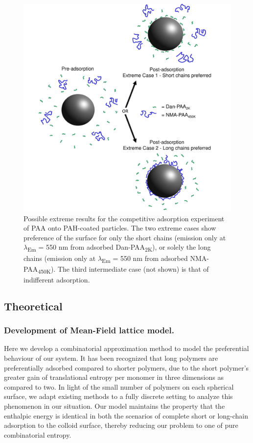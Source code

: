 \documentclass[twoside,twocolumn,9pt]{article}
\begin{document}
\begin{figure}[h]
\includegraphics[scale=0.12]{Figure2.pdf}
\caption{Possible extreme results for the competitive adsorption experiment of PAA onto PAH-coated particles.  The two extreme cases show preference of the surface for only the short chains (emission only at $\lambda$\textsubscript{Em} = 550 nm from adsorbed Dan-PAA\textsubscript{2K}), or solely the long chains (emission only at $\lambda$\textsubscript{Em} = 550 nm from adsorbed NMA-PAA\textsubscript{450K}).  The third intermediate case (not shown) is that of indifferent adsorption.}
\label{figure 4}
\end{figure}


\subsection{Theoretical}   %
    \label{sec-meth-theor}

\subsubsection{Development of Mean-Field lattice model.}   %
   \label{sec-devMF}

Here we develop a combinatorial approximation method
to model the preferential behaviour of our system.
It has been recognized that long polymers are
preferentially adsorbed compared to shorter polymers,
due to the short polymer's greater gain of
translational entropy per monomer in three dimensions
as compared to two.\cite{Fleer1993} 
In light of the small number of polymers on each
spherical surface, we adapt existing methods to a
fully discrete setting to analyze this phenomenon in our
situation.  Our model maintains the property that the enthalpic energy is identical in both the scenarios of complete short or long-chain adsorption to the colloid surface, thereby reducing our problem
to one of pure 
combinatorial entropy. 
\end{document}
